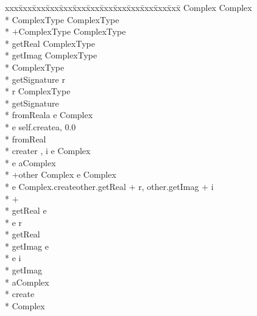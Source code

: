 {\small\it\begin{minipage}{\textwidth}\begin{tabbing}
xxx\=xxx\=xxx\=xxx\=xxx\=xxx\=xxx\=xxx\=xxx\=xxx\=xxx\=xxx\=xxx\=\+\kill%
 Complex \assign{}   Complex\+\\*{}%
   ComplexType \assign{}   ComplexType\+\\*{}%
     $+$\/\LB{}ComplexType\/\RB{} \returns{} \/\LB{}ComplexType\/\RB{}\\*{}%
     getReal \returns{} \/\LB{}ComplexType\/\RB{}\\*{}%
     getImag \returns{} \/\LB{}ComplexType\/\RB{}\-\\*{}%
   ComplexType\\*{}%
    getSignature \returns{} \/\LB{}r \CO{} \/\RB{}\+\\*{}%
    r \assign{} ComplexType\-\\*{}%
   getSignature\\*{}%
    fromReal\/\LB{}a \CO{} \/\RB{} \returns{} \/\LB{}e \CO{} Complex\/\RB{}\+\\*{}%
    e \assign{} self.create\/\LB{}a, 0.0\/\RB{}\-\\*{}%
   fromReal\\*{}%
    create\/\LB{}r \CO{} , i \CO{} \/\RB{} \returns{} \/\LB{}e \CO{} Complex\/\RB{}\+\\*{}%
    e \assign{}   aComplex\+\\*{}%
        $+$\/\LB{}other \CO{} Complex\/\RB{} \returns{} \/\LB{}e \CO{} Complex\/\RB{}\+\\*{}%
	e \assign{} Complex.create\/\LB{}other.getReal $+$ r, other.getImag $+$ i\/\RB{}\-\\*{}%
       $+$\\*{}%
        getReal \returns{} \/\LB{}e \CO{} \/\RB{}\+\\*{}%
	e \assign{} r\-\\*{}%
       getReal\\*{}%
        getImag \returns{} \/\LB{}e \CO{} \/\RB{}\+\\*{}%
	e \assign{} i\-\\*{}%
       getImag\-\\*{}%
     aComplex\-\\*{}%
   create\-\\*{}%
 Complex
\end{tabbing}\end{minipage}}

